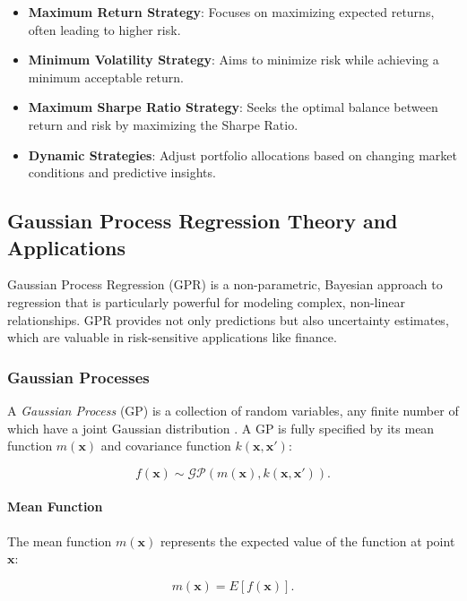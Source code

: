 \begin{itemize}
    \item \textbf{Maximum Return Strategy}: Focuses on maximizing expected returns, often leading to higher risk.
    \item \textbf{Minimum Volatility Strategy}: Aims to minimize risk while achieving a minimum acceptable return.
    \item \textbf{Maximum Sharpe Ratio Strategy}: Seeks the optimal balance between return and risk by maximizing the Sharpe Ratio.
    \item \textbf{Dynamic Strategies}: Adjust portfolio allocations based on changing market conditions and predictive insights.
\end{itemize}

\subsection{Gaussian Process Regression Theory and Applications}

Gaussian Process Regression (GPR) is a non-parametric, Bayesian approach to regression that is particularly powerful for modeling complex, non-linear relationships. GPR provides not only predictions but also uncertainty estimates, which are valuable in risk-sensitive applications like finance.

\subsubsection{Gaussian Processes}

A \textit{Gaussian Process} (GP) is a collection of random variables, any finite number of which have a joint Gaussian distribution \cite{rasmussen2006gaussian}. A GP is fully specified by its mean function $m(\mathbf{x})$ and covariance function $k(\mathbf{x}, \mathbf{x}')$:

\begin{equation}
    f(\mathbf{x}) \sim \mathcal{GP}\left( m(\mathbf{x}), k(\mathbf{x}, \mathbf{x}') \right).
\end{equation}

\paragraph{Mean Function}

The mean function $m(\mathbf{x})$ represents the expected value of the function at point $\mathbf{x}$:

\begin{equation}
    m(\mathbf{x}) = E[f(\mathbf{x})].
\end{equation}

